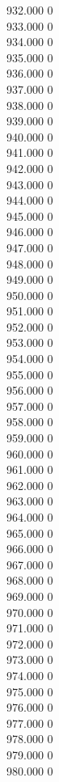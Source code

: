 { 932.000	0 \\
 933.000	0 \\
 934.000	0 \\
 935.000	0 \\
 936.000	0 \\
 937.000	0 \\
 938.000	0 \\
 939.000	0 \\
 940.000	0 \\
 941.000	0 \\
 942.000	0 \\
 943.000	0 \\
 944.000	0 \\
 945.000	0 \\
 946.000	0 \\
 947.000	0 \\
 948.000	0 \\
 949.000	0 \\
 950.000	0 \\
 951.000	0 \\
 952.000	0 \\
 953.000	0 \\
 954.000	0 \\
 955.000	0 \\
 956.000	0 \\
 957.000	0 \\
 958.000	0 \\
 959.000	0 \\
 960.000	0 \\
 961.000	0 \\
 962.000	0 \\
 963.000	0 \\
 964.000	0 \\
 965.000	0 \\
 966.000	0 \\
 967.000	0 \\
 968.000	0 \\
 969.000	0 \\
 970.000	0 \\
 971.000	0 \\
 972.000	0 \\
 973.000	0 \\
 974.000	0 \\
 975.000	0 \\
 976.000	0 \\
 977.000	0 \\
 978.000	0 \\
 979.000	0 \\
 980.000	0 \\
}
